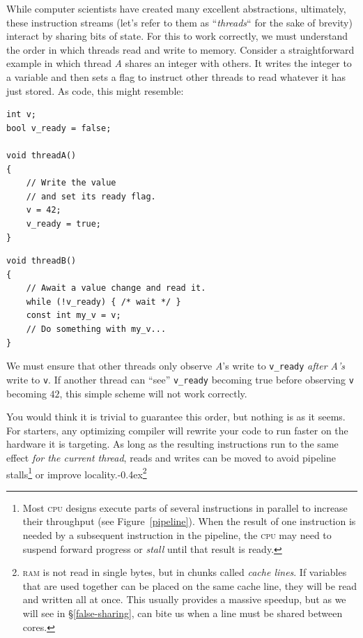 \documentclass[fontsize=10pt, oneside]{scrartcl}
\newcommand{\codesize}{\fontsize{\bodyfontsize}{\bodybaselineskip}}
\newcommand{\punckern}{\kern-0.4ex}
\newcommand{\fig}[1]{Figure~\ref{#1}}
\newcommand{\introduce}[1]{\textit{#1}}
\newcommand{\secref}[1]{\hyperref[#1]{\textsc{\S}\ref*{#1}}}
\newenvironment{colfigure}
  {\par\vspace{1\baselineskip minus 0.5\baselineskip}\noindent\minipage{\linewidth}}
  {\endminipage\vspace{1\baselineskip minus 0.7\baselineskip}}
\begin{document}
While computer scientists have created many excellent abstractions, ultimately,
these instruction streams (let's refer to them as ``\emph{threads}`` for the sake of brevity) interact by sharing bits of state.
For this to work correctly, we must understand the order in which threads read and write to memory.
Consider a straightforward example in which thread \textit{A} shares an integer with others.
It writes the integer to a variable and then sets a flag to instruct other threads to read whatever it has just stored.
As code, this might resemble:
\begin{colfigure}
\begin{verbatim}
int v;
bool v_ready = false;

void threadA()
{
    // Write the value
    // and set its ready flag.
    v = 42;
    v_ready = true;
}
\end{verbatim}
\end{colfigure}
\begin{colfigure}
\begin{verbatim}
void threadB()
{
    // Await a value change and read it.
    while (!v_ready) { /* wait */ }
    const int my_v = v;
    // Do something with my_v...
}
\end{verbatim}
\end{colfigure}
We must ensure that other threads only observe \textit{A}'s write to \texttt{v\_ready} \emph{after A's} write to \texttt{v}.
If another thread can ``see'' \texttt{v\_ready} becoming true before observing \texttt{v} becoming $42$,
this simple scheme will not work correctly.

You would think it is trivial to guarantee this order, but nothing is as it seems.
For starters, any optimizing compiler will rewrite your code to run faster on the hardware it is targeting.
As long as the resulting instructions run to the same effect \emph{for the current thread},
reads and writes can be moved to avoid pipeline stalls\footnote{%
Most \textsc{cpu} designs execute parts of several instructions in parallel to increase their throughput (see \fig{pipeline}).
When the result of one instruction is needed by a subsequent instruction in the pipeline,
the \textsc{cpu} may need to suspend forward progress or \introduce{stall} until that result is ready.}
or improve locality.\punckern\footnote{%
\textsc{ram} is not read in single bytes, but in chunks called \introduce{cache lines}.
If variables that are used together can be placed on the same cache line,
they will be read and written all at once.
This usually provides a massive speedup,
but as we will see in \secref{false-sharing},
can bite us when a line must be shared between cores.}
\end{document}
